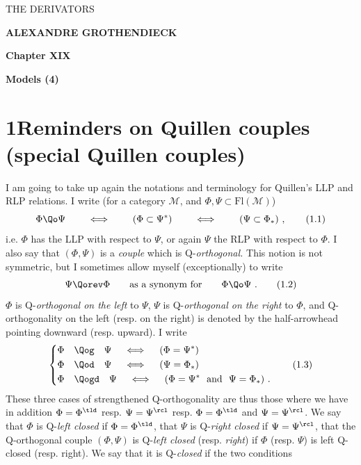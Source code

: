 
\begin{center}
{\Large\textsf{THE DERIVATORS}}

\bigskip

\textbf{ALEXANDRE GROTHENDIECK}

\bigskip\bigskip

\textbf{Chapter XIX}

\medskip

\textbf{Models (4)}
\end{center}

\newpage



\newpage



\section*{1\quad Reminders on Quillen couples (special Quillen couples)}

I am going to take up again the notations and terminology for Quillen's LLP and RLP relations. I write (for a category $\mathcal{M}$, and $\Phi, \Psi \subset \mathrm{Fl}(\mathcal{M})$)
\[
\Phi \Qo \Psi \qquad \iff \qquad (\Phi \subset \Psi^{*}) \qquad \iff \qquad (\Psi \subset \Phi_{*})\ ,
\tag*{(1.1)}
\]
i.e. $\Phi$ has the LLP with respect to $\Psi$, or again $\Psi$ the RLP with respect to $\Phi$. I also say that $(\Phi, \Psi)$ is a \textit{couple} which is Q-\textit{orthogonal.} This notion is not symmetric, but I sometimes allow myself (exceptionally) to write
\[
\Psi \Qorev \Phi \qquad \text{as a synonym for} \qquad \Phi \Qo \Psi\ .
\tag*{(1.2)}
\]
$\Phi$ is Q-\textit{orthogonal on the left} to $\Psi$, $\Psi$ is Q-\textit{orthogonal on the right} to $\Phi$, and Q-orthogonality on the left (resp. on the right) is denoted by the half-arrowhead pointing downward (resp. upward). I write
\[
\left\{
\begin{aligned}
&\Phi \quad \Qog \quad \Psi \quad \iff \quad (\Phi = \Psi^{*})\\
&\Phi \quad \Qod \quad \Psi \quad \iff \quad (\Psi = \Phi_{*})\\
&\Phi \quad \Qogd \quad \Psi \quad \iff \quad (\Phi = \Psi^{*} \ \text{ and } \ \Psi = \Phi_{*})\ .
\end{aligned}
\right.
\tag*{(1.3)}
\]
These three cases of strengthened Q-orthogonality are thus those where we have in addition $\Phi = \Phi^{\tld}$
resp. $\Psi = \Psi^{\rcl}$ resp. $\Phi = \Phi^{\tld}$ and $\Psi = \Psi^{\rcl}$. We say that $\Phi$ is Q-\textit{left closed} if $\Phi = \Phi^{\tld}$, that %
$\Psi$ is Q-\textit{right closed} if $\Psi = \Psi^{\rcl}$, that the Q-orthogonal couple $(\Phi, \Psi)$ is Q-\textit{left closed} (resp. \textit{right}) if $\Phi$ (resp. $\Psi$) is left Q-closed (resp. right). We say that it is Q-\textit{closed} if the two conditions %

